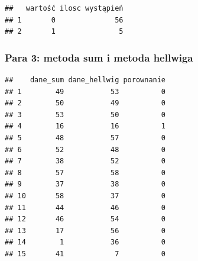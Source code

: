 \documentclass[12pt,a4paper]{report}
\begin{document}
{\begin{verbatim}
##   wartość ilosc wystąpień
## 1       0              56
## 2       1               5
\end{verbatim}

\subsubsection{Para 3: metoda sum i metoda
hellwiga}\label{para-3-metoda-sum-i-metoda-hellwiga}

\begin{Shaded}
\begin{Highlighting}[]
\NormalTok{(}\NormalTok{,}\NormalTok{)}

\NormalTok{:}
  \NormalTok{\}}
\NormalTok{\}}
\NormalTok{)}
\end{Highlighting}
\end{Shaded}

\begin{verbatim}
##    dane_sum dane_hellwig porownanie
## 1        49           53          0
## 2        50           49          0
## 3        53           50          0
## 4        16           16          1
## 5        48           57          0
## 6        52           48          0
## 7        38           52          0
## 8        57           58          0
## 9        37           38          0
## 10       58           37          0
## 11       44           46          0
## 12       46           54          0
## 13       17           56          0
## 14        1           36          0
## 15       41            7          0
\end{verbatim}

\begin{Shaded}
\begin{Highlighting}[]
\NormalTok{(}
\NormalTok{(}\NormalTok{,}\NormalTok{)}
\end{Highlighting}
\end{Shaded}

}
\end{document}
